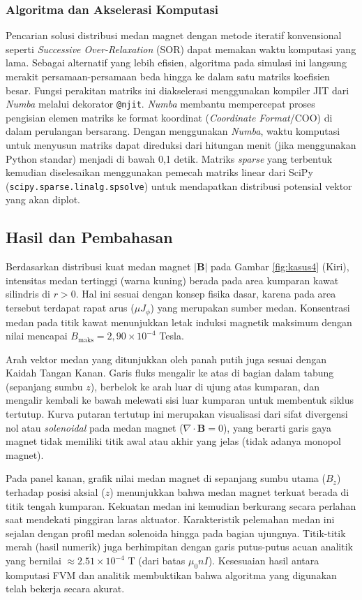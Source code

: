 \documentclass[11pt,a4paper]{article}
\begin{document}
\subsubsection{Algoritma dan Akselerasi Komputasi}
Pencarian solusi distribusi medan magnet dengan metode iteratif konvensional seperti \textit{Successive Over-Relaxation} (SOR) dapat memakan waktu komputasi yang lama. Sebagai alternatif yang lebih efisien, algoritma pada simulasi ini langsung merakit persamaan-persamaan beda hingga ke dalam satu matriks koefisien besar. Fungsi perakitan matriks ini diakselerasi menggunakan kompiler JIT dari \textit{Numba} melalui dekorator \texttt{@njit}. \textit{Numba} membantu mempercepat proses pengisian elemen matriks ke format koordinat (\textit{Coordinate Format}/COO) di dalam perulangan bersarang. Dengan menggunakan \textit{Numba}, waktu komputasi untuk menyusun matriks dapat direduksi dari hitungan menit (jika menggunakan Python standar) menjadi di bawah 0,1 detik. Matriks \textit{sparse} yang terbentuk kemudian diselesaikan menggunakan pemecah matriks linear dari SciPy (\texttt{scipy.sparse.linalg.spsolve}) untuk mendapatkan distribusi potensial vektor yang akan diplot.

\subsection{Hasil dan Pembahasan}

Berdasarkan distribusi kuat medan magnet $|\mathbf{B}|$ pada Gambar \ref{fig:kasus4} (Kiri), intensitas medan tertinggi (warna kuning) berada pada area kumparan kawat silindris di $r > 0$. Hal ini sesuai dengan konsep fisika dasar, karena pada area tersebut terdapat rapat arus ($\mu J_\phi$) yang merupakan sumber medan. Konsentrasi medan pada titik kawat menunjukkan letak induksi magnetik maksimum dengan nilai mencapai $B_{\mathrm{maks}} = 2{,}90 \times 10^{-4}$ Tesla.

Arah vektor medan yang ditunjukkan oleh panah putih juga sesuai dengan Kaidah Tangan Kanan. Garis fluks mengalir ke atas di bagian dalam tabung (sepanjang sumbu $z$), berbelok ke arah luar di ujung atas kumparan, dan mengalir kembali ke bawah melewati sisi luar kumparan untuk membentuk siklus tertutup. Kurva putaran tertutup ini merupakan visualisasi dari sifat divergensi nol atau \textit{solenoidal} pada medan magnet ($\nabla \cdot \mathbf{B} = 0$), yang berarti garis gaya magnet tidak memiliki titik awal atau akhir yang jelas (tidak adanya monopol magnet).

Pada panel kanan, grafik nilai medan magnet di sepanjang sumbu utama ($B_z$) terhadap posisi aksial ($z$) menunjukkan bahwa medan magnet terkuat berada di titik tengah kumparan. Kekuatan medan ini kemudian berkurang secara perlahan saat mendekati pinggiran laras aktuator. Karakteristik pelemahan medan ini sejalan dengan profil medan solenoida hingga pada bagian ujungnya. Titik-titik merah (hasil numerik) juga berhimpitan dengan garis putus-putus acuan analitik yang bernilai $\approx 2.51 \times 10^{-4}$ T (dari batas $\mu_0 n I$). Kesesuaian hasil antara komputasi FVM dan analitik membuktikan bahwa algoritma yang digunakan telah bekerja secara akurat.
\end{document}
